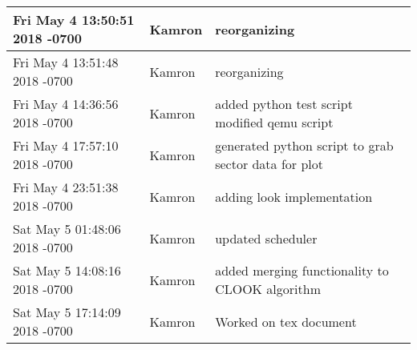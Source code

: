 \begin{tabular}{l l l}
Fri May 4 13:50:51 2018 -0700 & Kamron & reorganizing\\\hline
Fri May 4 13:51:48 2018 -0700 & Kamron & reorganizing\\\hline
Fri May 4 14:36:56 2018 -0700 & Kamron & added python test script modified qemu script\\\hline
Fri May 4 17:57:10 2018 -0700 & Kamron & generated python script to grab sector data for plot\\\hline
Fri May 4 23:51:38 2018 -0700 & Kamron & adding look implementation\\\hline
Sat May 5 01:48:06 2018 -0700 & Kamron & updated scheduler\\\hline
Sat May 5 14:08:16 2018 -0700 & Kamron & added merging functionality to CLOOK algorithm\\\hline
Sat May 5 17:14:09 2018 -0700 & Kamron & Worked on tex document\\\hline
\end{tabular}
